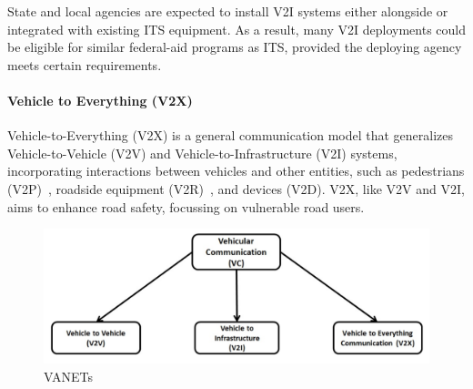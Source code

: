 State and local agencies are expected to install V2I systems either alongside or integrated with existing ITS equipment.
As a result, many V2I deployments could be eligible for similar federal-aid programs as ITS,
provided the deploying agency meets certain requirements\cite{dot2024v2i}.

\paragraph{Vehicle to Everything (V2X)}

Vehicle-to-Everything (V2X) is a general communication model that generalizes Vehicle-to-Vehicle (V2V) and Vehicle-to-Infrastructure (V2I) systems,
incorporating interactions between vehicles and other entities, such as pedestrians (V2P)~\cite{vehicle-to-pedestrian}, roadside equipment (V2R)~\cite{vehicle-to-roadside}, and devices (V2D).
V2X, like V2V and V2I, aims to enhance road safety, focussing on vulnerable road users.

\begin{figure}[!htb]
    \centering
    \includegraphics[width=0.7\linewidth]{figures/communication}
    \caption{VANETs}
    \label{fig:communication}
\end{figure}


